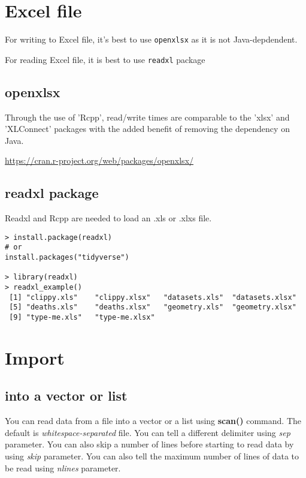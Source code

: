 \section{Excel file}

For writing to Excel file, it's best to use \verb!openxlsx! as it is not Java-depdendent.

For reading Excel file, it is best to use  \verb!readxl! package

\subsection{openxlsx}

 Through the use of 'Rcpp', read/write times are comparable to the 'xlsx' and
 'XLConnect' packages with the added benefit of removing the dependency on Java.
 
\url{https://cran.r-project.org/web/packages/openxlsx/}


\subsection{readxl package}
\label{sec:readxl-package}

Readxl and Rcpp are needed to load an .xls or .xlxs file.

\begin{verbatim}
> install.package(readxl)
# or
install.packages("tidyverse")

> library(readxl)
> readxl_example()
 [1] "clippy.xls"    "clippy.xlsx"   "datasets.xls"  "datasets.xlsx"
 [5] "deaths.xls"    "deaths.xlsx"   "geometry.xls"  "geometry.xlsx"
 [9] "type-me.xls"   "type-me.xlsx" 
\end{verbatim}


\section{Import}
\label{sec:import}

\subsection{into a vector or list}
\label{sec:into-vector-or}

You can read data from a file into a vector or a list using
{\bf scan()} command. The default is {\it whitespace-separated}
file. You can tell a different delimiter using {\it sep}
parameter. You can also skip a number of lines before starting to read
data by using {\it skip} parameter. You can also tell the maximum
number of lines of data to be read using {\it nlines} parameter.

